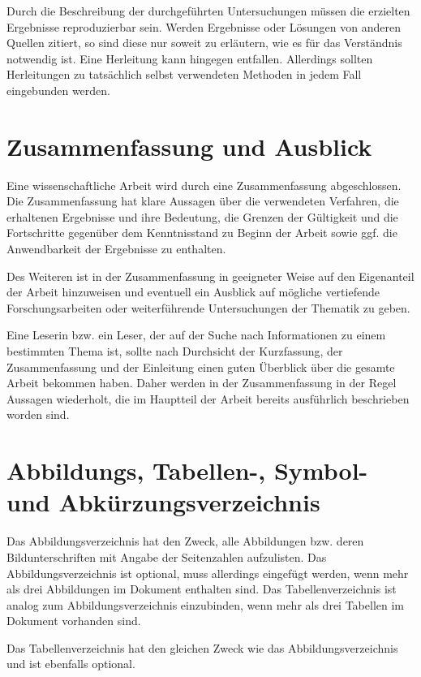 Durch die Beschreibung der durchgeführten Untersuchungen müssen die erzielten Ergebnisse reproduzierbar sein. Werden Ergebnisse oder Lösungen von anderen Quellen zitiert, so sind diese nur soweit zu erläutern, wie es für das Verständnis notwendig ist. Eine Herleitung kann hingegen entfallen. Allerdings sollten Herleitungen zu tatsächlich selbst verwendeten Methoden in jedem Fall eingebunden werden.

\section{Zusammenfassung und Ausblick}
\label{sec:Zusammenfassung}

Eine wissenschaftliche Arbeit wird durch eine Zusammenfassung abgeschlossen. Die Zusammenfassung hat klare Aussagen über die verwendeten Verfahren, die erhaltenen Ergebnisse und ihre Bedeutung, die Grenzen der Gültigkeit und die Fortschritte gegenüber dem Kenntnisstand zu Beginn der Arbeit sowie ggf. die Anwendbarkeit der Ergebnisse zu enthalten. 

Des Weiteren ist in der Zusammenfassung in geeigneter Weise auf den Eigenanteil der Arbeit hinzuweisen und eventuell ein Ausblick auf mögliche vertiefende Forschungsarbeiten oder weiterführende Untersuchungen der Thematik zu geben.

Eine Leserin bzw. ein Leser, der auf der Suche nach Informationen zu einem bestimmten Thema ist, sollte nach Durchsicht der Kurzfassung, der Zusammenfassung und der Einleitung einen guten Überblick über die gesamte Arbeit bekommen haben. Daher werden in der Zusammenfassung in der Regel Aussagen wiederholt, die im Hauptteil der Arbeit bereits ausführlich beschrieben worden sind.

\section{Abbildungs, Tabellen-, Symbol- und Abkürzungsverzeichnis}
\label{sec:Abb-Tab-Symb-Abk-v}

Das Abbildungsverzeichnis hat den Zweck, alle Abbildungen bzw. deren Bildunterschriften mit Angabe der Seitenzahlen aufzulisten. Das Abbildungsverzeichnis ist optional, muss allerdings eingefügt werden, wenn mehr als drei Abbildungen im Dokument enthalten sind. Das Tabellenverzeichnis ist analog zum Abbildungsverzeichnis einzubinden, wenn mehr als drei Tabellen im Dokument vorhanden sind.

Das Tabellenverzeichnis hat den gleichen Zweck wie das Abbildungsverzeichnis und ist ebenfalls optional.

